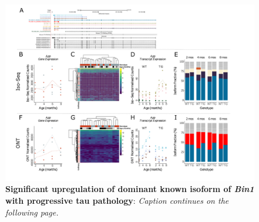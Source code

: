 \begin{landscape}
	\begin{figure}[htp]
		\begin{center}
			\includegraphics[page=7,trim={0 0.5cm 0 1.5cm},scale =0.85]{Figures/TargetGene_DifferentialAnalysis.pdf}
		\end{center}
		\captionsetup{width=1.5\textwidth}
		\caption[Differential Isoform Expression: Changes in transcript expression of isoforms associated with \textit{Bin1}]%
		{\textbf{Significant upregulation of dominant known isoform of \textit{Bin1} with progressive tau pathology}: \textit{Caption continues on the following page.}}   
		\label{fig:bin1_diff_analysis}
	\end{figure}
	\begin{figure}[p]
		\captionsetup{width=1.5\textwidth}
	\end{figure}
\end{landscape}

